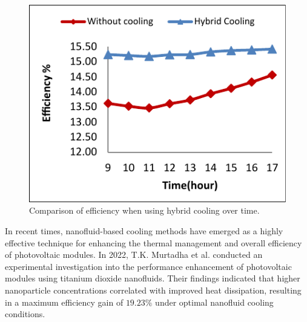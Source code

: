 \begin{figure}[H]
\begin{minipage}[b]{0.45\linewidth}
        \includegraphics[width=\linewidth]{Figures/hybrid_cooling_efficiency_graph.pdf}
        \caption{Comparison of efficiency when using hybrid cooling over time. \cite{Al-Masalha2024ImprovingSystems}}
        \label{fig:hybrid_cooling_efficiency_graph}
    \end{minipage}
\end{figure}

In recent times, nanofluid-based cooling methods have emerged as a highly effective technique for enhancing the thermal management and overall efficiency of photovoltaic modules. In 2022, T.K. Murtadha et al. conducted an experimental investigation into the performance enhancement of photovoltaic modules using titanium dioxide nanofluids. Their findings indicated that higher nanoparticle concentrations correlated with improved heat dissipation, resulting in a maximum efficiency gain of $19.23\%$ under optimal nanofluid cooling conditions. \cite{Murtadha2022ImprovingNanofluid}\vspace{0.5em}

